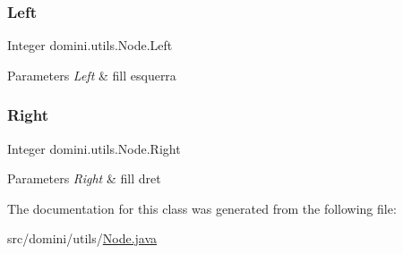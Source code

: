 \subsubsection{\texorpdfstring{Left}{Left}}
{\footnotesize\ttfamily Integer domini.\+utils.\+Node.\+Left\hspace{0.3cm}{\ttfamily [package]}}


\begin{DoxyParams}{Parameters}
{\em Left} & fill esquerra \\
\hline
\end{DoxyParams}
\mbox{\label{classdomini_1_1utils_1_1Node_a73c97e595bad2513ee0a06ee4620236a}} 
\subsubsection{\texorpdfstring{Right}{Right}}
{\footnotesize\ttfamily Integer domini.\+utils.\+Node.\+Right\hspace{0.3cm}{\ttfamily [package]}}


\begin{DoxyParams}{Parameters}
{\em Right} & fill dret \\
\hline
\end{DoxyParams}


The documentation for this class was generated from the following file\+:\begin{DoxyCompactItemize}
\item 
src/domini/utils/\hyperlink{Node_8java}{Node.\+java}\end{DoxyCompactItemize}
